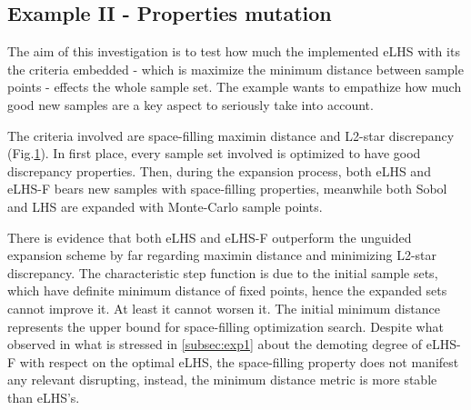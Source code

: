 \documentclass[12pt]{extarticle}
\newcommand{\mfigref}[1]{Fig.\ref{#1}}
\newcommand{\midcaption}[1]{
    \captionsetup{justification=centering}
    \caption{#1}
}
\begin{document}
\subsection{Example II - Properties mutation}
\label{subsec:exp2}
The aim of this investigation is to test how much the implemented eLHS with its the criteria embedded - which is maximize the minimum distance between sample points - effects the whole sample set. The example wants to empathize how much good new samples are a key aspect to seriously take into account.

The criteria involved are space-filling maximin distance and L2-star discrepancy (\mfigref{fig:exp2}). In first place, every sample set involved is optimized to have good discrepancy properties. Then, during the expansion process, both eLHS and eLHS-F bears new samples with space-filling properties, meanwhile both Sobol and LHS are expanded with Monte-Carlo sample points.

\begin{figure}[H]
    \centering
    \begin{subfigure}[a]{1\textwidth}
        \centering
    \end{subfigure}
    \begin{subfigure}[b]{1\textwidth}
        \centering
    \end{subfigure}
    \captionsetup{skip=0pt}
    \midcaption{}
    \label{fig:exp2}
\end{figure}

There is evidence that both eLHS and eLHS-F outperform the unguided expansion scheme by far regarding maximin distance and minimizing L2-star discrepancy. The characteristic step function is due to the initial sample sets, which have definite minimum distance of fixed points, hence the expanded sets cannot improve it. At least it cannot worsen it. The initial minimum distance represents the upper bound for space-filling optimization search. Despite what observed in what is stressed in \cref{subsec:exp1} about the demoting degree of eLHS-F with respect on the optimal eLHS, the space-filling property does not manifest any relevant disrupting, instead, the minimum distance metric is more stable than eLHS's. 
\end{document}
